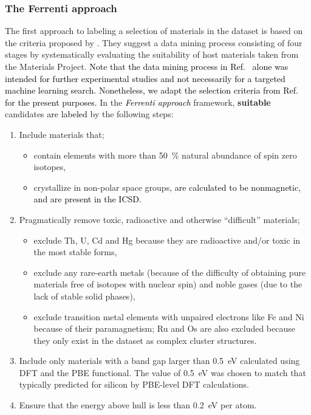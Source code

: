 \documentclass[superscriptaddress,unsortedaddress,
 amsmath,amssymb,
 aps,
]{revtex4-2}
\newcommand{\mrk}[1]{\textcolor{black}{#1}}
\begin{document}
\subsubsection*{The Ferrenti approach}
The first approach to labeling a selection of materials in the dataset is based on the criteria proposed by \citeauthor{Ferrenti2020} \cite{Ferrenti2020}. 
They suggest a data mining process consisting of four stages by systematically evaluating the suitability of host materials taken from the Materials Project. 
\mrk{Note that the data mining process in Ref.~\cite{Ferrenti2020} alone was intended for further experimental studies and not necessarily for a targeted machine learning search. Nonetheless, we adapt the selection criteria from Ref.~\cite{Ferrenti2020} for the present purposes.} 
In the \mrk{\emph{Ferrenti approach}} framework, \textbf{suitable} candidates \mrk{are labeled} by the following steps: 
\begin{enumerate}
    \item Include materials that;
    \begin{itemize}
        \item contain elements with more than \SI{50}{\percent} natural abundance of spin zero isotopes,
        \item crystallize in non-polar space groups, \mrk{are calculated to be nonmagnetic, and 
        are present in the ICSD.}
    \end{itemize}
    \item Pragmatically remove toxic, radioactive and otherwise ``difficult'' materials;
    \begin{itemize}
        \item exclude Th, U, Cd and Hg because they are radioactive and/or toxic in the most stable forms,
        \item exclude any rare-earth metals (because of the difficulty of obtaining pure materials free of isotopes with nuclear spin) and noble gases (due to the lack of stable solid phases),
        \item exclude transition metal elements with unpaired electrons like Fe and Ni because of their paramagnetism; Ru and Os are also excluded because they only exist in the dataset as complex cluster structures. 
    \end{itemize}
    \item Include only materials with a band gap larger than \SI{0.5}{\electronvolt} calculated using DFT and the PBE functional.
    The value of \SI{0.5}{\electronvolt} was chosen to match that typically predicted for silicon by PBE-level DFT calculations. 
    \item Ensure that the energy above hull is less than \SI{0.2}{\electronvolt} per atom.
\end{enumerate}
\end{document}
